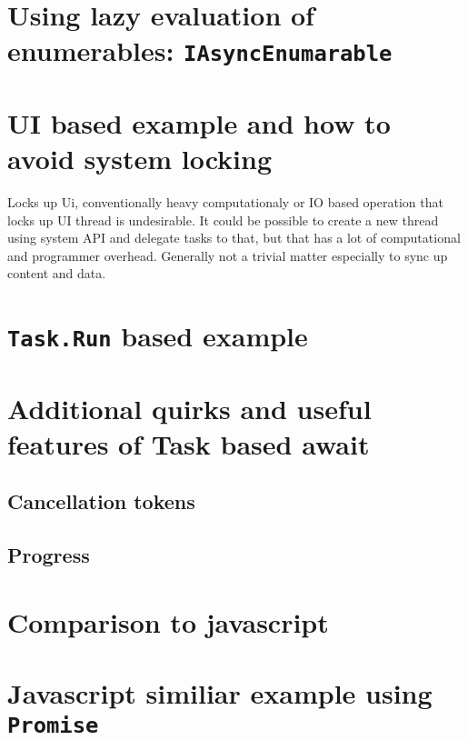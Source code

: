 \documentclass{article}
\begin{document}
\section{Using lazy evaluation of enumerables: \texttt{IAsyncEnumarable}}

\section{UI based example and how to avoid system locking}
Locks up Ui, conventionally heavy computationaly or IO based operation that locks up UI thread is undesirable.
It could be possible to create a new thread using system API and delegate tasks to that,
but that has a lot of computational and programmer overhead.
Generally not a trivial matter especially to sync up content and data.


\section{\texttt{Task.Run} based example}


\section{Additional quirks and useful features of Task based await}
\subsection{Cancellation tokens}
\subsection{Progress}


\section{Comparison to javascript}

\section{Javascript similiar example using \texttt{Promise}}




\end{document}
